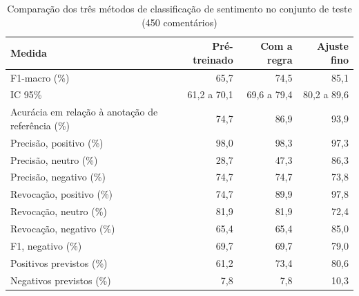 \begin{table}[htb]
\centering
\caption{Comparação dos três métodos de classificação de sentimento no conjunto de teste (450 comentários)}
\label{tab:sentimento_metodos}
\footnotesize
\begin{tabular}{lrrr}
\toprule
\textbf{Medida} & \textbf{Pré-treinado} & \textbf{Com a regra} & \textbf{Ajuste fino} \\
\midrule
F1-macro (\%) & 65,7 & 74,5 & 85,1 \\
\quad IC 95\% & 61,2 a 70,1 & 69,6 a 79,4 & 80,2 a 89,6 \\
Acurácia em relação à anotação de referência (\%) & 74,7 & 86,9 & 93,9 \\
\midrule
Precisão, positivo (\%) & 98,0 & 98,3 & 97,3 \\
Precisão, neutro (\%) & 28,7 & 47,3 & 86,3 \\
Precisão, negativo (\%) & 74,7 & 74,7 & 73,8 \\
Revocação, positivo (\%) & 74,7 & 89,9 & 97,8 \\
Revocação, neutro (\%) & 81,9 & 81,9 & 72,4 \\
Revocação, negativo (\%) & 65,4 & 65,4 & 85,0 \\
F1, negativo (\%) & 69,7 & 69,7 & 79,0 \\
\midrule
Positivos previstos (\%) & 61,2 & 73,4 & 80,6 \\
Negativos previstos (\%) & 7,8 & 7,8 & 10,3 \\
\bottomrule
\end{tabular}
\end{table}

